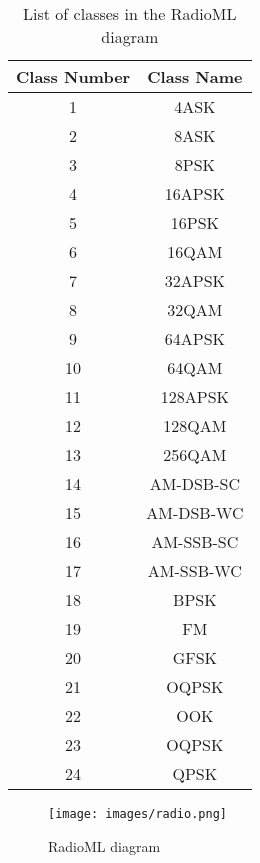 \begin{table}[h]
    \centering
    \caption{List of classes in the RadioML diagram}
    \begin{tabular}{|c|c|}
        \hline
        Class Number & Class Name \\ \hline
        1 & 4ASK \\ \hline
        2 & 8ASK \\ \hline
        3 & 8PSK \\ \hline
        4 & 16APSK \\ \hline
        5 & 16PSK \\ \hline
        6 & 16QAM \\ \hline
        7 & 32APSK \\ \hline
        8 & 32QAM \\ \hline
        9 & 64APSK \\ \hline
        10 & 64QAM \\ \hline
        11 & 128APSK \\ \hline
        12 & 128QAM \\ \hline
        13 & 256QAM \\ \hline
        14 & AM-DSB-SC \\ \hline
        15 & AM-DSB-WC \\ \hline
        16 & AM-SSB-SC \\ \hline
        17 & AM-SSB-WC \\ \hline
        18 & BPSK \\ \hline
        19 & FM \\ \hline
        20 & GFSK \\ \hline
        21 & OQPSK \\ \hline
        22 & OOK \\ \hline
        23 & OQPSK \\ \hline
        24 & QPSK \\ \hline
    \end{tabular}
    \label{tab:radioml_classes}
\end{table}


\begin{figure*}[htbp]
    \centering
    \texttt{[image: images/radio.png]}
    \caption{RadioML diagram}
    \label{fig:radio}
\end{figure*}

